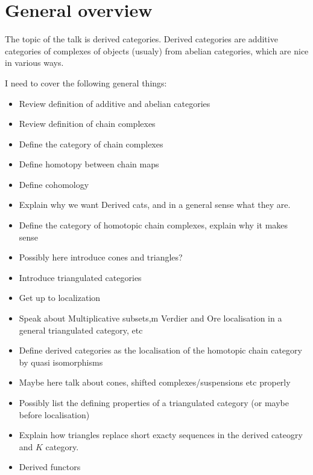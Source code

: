 \documentclass[a4paper]{article}
\begin{document}
\maketitle
\section{General overview}
The topic of the talk is derived categories. Derived categories are additive categories of complexes of objects (usualy) from abelian categories, which are nice in various ways.

I need to cover the following general things:
\begin{itemize}
    \item Review definition of additive and abelian categories
    \item Review definition of chain complexes
    \item Define the category of chain complexes
    \item Define homotopy between chain maps
    \item Define cohomology
    \item Explain why we want Derived cats, and in a general sense what they are.
    \item Define the category of homotopic chain complexes, explain why it makes sense
    \item Possibly here introduce cones and triangles?
    \item Introduce triangulated categories
    \item Get up to localization
    \item Speak about Multiplicative subsets,m Verdier and Ore localisation in a general triangulated category, etc
    \item Define derived categories as the localisation of the homotopic chain category by quasi isomorphisms
    \item Maybe here talk about cones, shifted complexes/suspensions etc properly
    \item Possibly list the defining properties of a triangulated category (or maybe before localisation)
    \item Explain how triangles replace short exacty sequences in the derived cateogry and $K$ category.
    \item Derived functors
\end{itemize}
\end{document}
